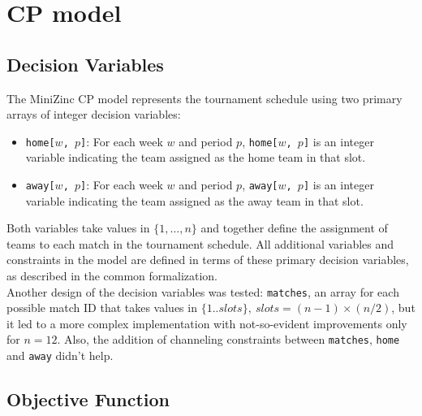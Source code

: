 \documentclass[11pt]{article}
\begin{document}
\section{CP model}

\subsection{Decision Variables}

The MiniZinc CP model represents the tournament schedule using two primary arrays of integer decision variables:

\begin{itemize}
    \item \texttt{home[$w$, $p$]}: For each week $w$ and period $p$, \texttt{home[$w$, $p$]} is an integer variable indicating the team assigned as the home team in that slot.
    \item \texttt{away[$w$, $p$]}: For each week $w$ and period $p$, \texttt{away[$w$, $p$]} is an integer variable indicating the team assigned as the away team in that slot.
\end{itemize}

Both variables take values in $\{1, \ldots, n\}$ and together define the assignment of teams to each match in the tournament schedule. All additional variables and constraints in the model are defined in terms of these primary decision variables, as described in the common formalization. \\
Another design of the decision variables was tested: \texttt{matches}, an array for each possible match ID that takes values in $\{1..slots\},\ slots = (n-1)\times(n/2)$, but it led to a more complex implementation with not-so-evident improvements only for $n=12$. Also, the addition of channeling constraints between \texttt{matches}, \texttt{home} and \texttt{away} didn't help.

\subsection{Objective Function}
\end{document}
